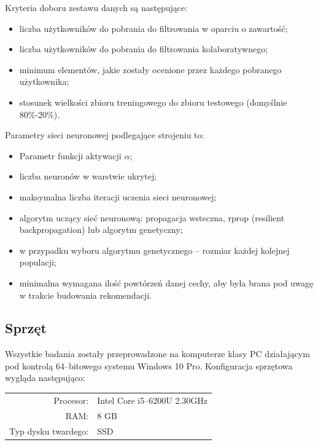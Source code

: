 \documentclass[twoside]{iisthesis}
\begin{document}
		 Kryteria doboru zestawu danych są następujące:
		 
		 \begin{itemize}
		 	\item liczba użytkowników do pobrania do filtrowania w oparciu o zawartość;
		 	\item liczba użytkowników do pobrania do filtrowania kolaboratywnego;
		 	\item minimum elementów, jakie zostały ocenione przez każdego pobranego użytkownika;
		 	\item stosunek wielkości zbioru treningowego do zbioru testowego (domyślnie 80\%-20\%).
		 \end{itemize}
		 
		 Parametry sieci neuronowej podlegające strojeniu to:
		 
		 
		 \begin{itemize}
		 	\item Parametr funkcji aktywacji $\alpha$;
		 	\item liczba neuronów w warstwie ukrytej;
		 	\item maksymalna liczba iteracji uczenia sieci neuronowej;
		 	\item algorytm uczący sieć neuronową: propagacja wsteczna, rprop (resilient backpropagation) lub algorytm genetyczny;
		 	\item w przypadku wyboru algorytmu genetycznego -- rozmiar każdej kolejnej populacji;
		 	\item minimalna wymagana ilość powtórzeń danej cechy, aby była brana pod uwagę w trakcie budowania rekomendacji.
		 \end{itemize}	 
		
		\subsection{Sprzęt}
		
		Wszystkie badania zostały przeprowadzone na komputerze klasy PC działającym pod kontrolą 64--bitowego systemu Windows 10 Pro. Konfiguracja sprzętowa wygląda następująco:
		
		\begin{center}
			\begin{tabular}{ r  l  }
				Procesor: & Intel Core i5--6200U 2.30GHz \\ 
				RAM: & 8 GB \\  
				Typ dysku twardego: & SSD     
			\end{tabular}
		\end{center}
	
\end{document}
